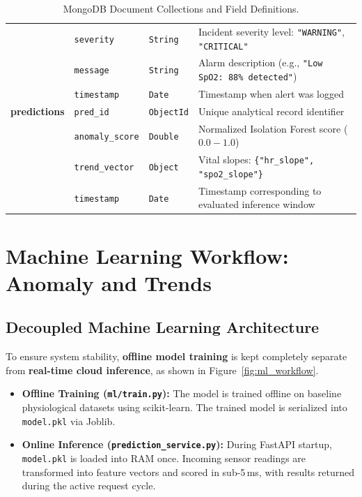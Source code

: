 \documentclass[12pt]{article}
\newlength{\wA}
\newlength{\wB}
\newlength{\wC}
\newlength{\wD}
\begin{document}
\begin{table}[htbp]
\begin{tabular}{|B{\wA}|L{\wB}|L{\wC}|L{\wD}|}
    & \texttt{severity} & \texttt{String} & Incident severity level: \texttt{"WARNING"}, \texttt{"CRITICAL"} \\
    & \texttt{message} & \texttt{String} & Alarm description (e.g., \texttt{"Low SpO2: 88\% detected"}) \\
    & \texttt{timestamp} & \texttt{Date} & Timestamp when alert was logged \\
    \hline
    \textbf{predictions} & \texttt{pred\_id} & \texttt{ObjectId} & Unique analytical record identifier \\
    & \texttt{anomaly\_score} & \texttt{Double} & Normalized Isolation Forest score ($0.0 - 1.0$) \\
    & \texttt{trend\_vector} & \texttt{Object} & Vital slopes: \texttt{\{"hr\_slope", "spo2\_slope"\}} \\
    & \texttt{timestamp} & \texttt{Date} & Timestamp corresponding to evaluated inference window \\
    \hline
\end{tabular}
\caption{MongoDB Document Collections and Field Definitions.}
\label{tab:mongo_schema}
\end{table}
\clearpage

\section{Machine Learning Workflow: Anomaly and Trends}
\label{sec:ml_workflow}

\subsection{Decoupled Machine Learning Architecture}
To ensure system stability, \textbf{offline model training} is kept completely separate from \textbf{real-time cloud inference}, as shown in Figure~\ref{fig:ml_workflow}.
\begin{itemize}
    \item \textbf{Offline Training (\texttt{ml/train.py}):} The model is trained offline on baseline physiological datasets using scikit-learn. The trained model is serialized into \texttt{model.pkl} via Joblib.
    \item \textbf{Online Inference (\texttt{prediction\_service.py}):} During FastAPI startup, \texttt{model.pkl} is loaded into RAM once. Incoming sensor readings are transformed into feature vectors and scored in sub-5\,ms, with results returned during the active request cycle.
\end{itemize}
\end{document}
